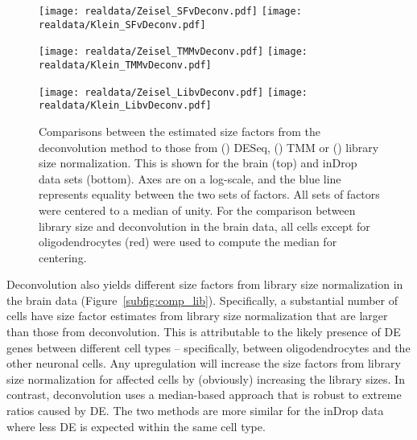\documentclass{article}
\begin{document}
\begin{figure}[btp]
    \begin{minipage}{0.33\textwidth}
        \texttt{[image: realdata/Zeisel\_SFvDeconv.pdf]}
        \texttt{[image: realdata/Klein\_SFvDeconv.pdf]}
        \subcaption{}\label{subfig:comp_sf}
    \end{minipage}
    \begin{minipage}{0.33\textwidth}
        \texttt{[image: realdata/Zeisel\_TMMvDeconv.pdf]}
        \texttt{[image: realdata/Klein\_TMMvDeconv.pdf]}
    \subcaption{}\label{subfig:comp_tmm}
    \end{minipage}
    \begin{minipage}{0.33\textwidth}
        \texttt{[image: realdata/Zeisel\_LibvDeconv.pdf]}
        \texttt{[image: realdata/Klein\_LibvDeconv.pdf]}
        \subcaption{}\label{subfig:comp_lib}
    \end{minipage}
    \caption{
        Comparisons between the estimated size factors from the deconvolution method to those from () DESeq,  () TMM
            or () library size normalization.
        This is shown for the brain (top) and inDrop data sets (bottom).
        Axes are on a log-scale, and the blue line represents equality between the two sets of factors.
        All sets of factors were centered to a median of unity.
        For the comparison between library size and deconvolution in the brain data, all cells except for oligodendrocytes (red) were used to compute the median for centering.
    }
    \label{fig:real_comp}  
\end{figure}

Deconvolution also yields different size factors from library size normalization in the brain data (Figure~\ref{subfig:comp_lib}).
Specifically, a substantial number of cells have size factor estimates from library size normalization that are larger than those from deconvolution.
This is attributable to the likely presence of DE genes between different cell types -- specifically, between oligodendrocytes and the other neuronal cells.
Any upregulation will increase the size factors from library size normalization for affected cells by (obviously) increasing the library sizes.
In contrast, deconvolution uses a median-based approach that is robust to extreme ratios caused by DE.
The two methods are more similar for the inDrop data where less DE is expected within the same cell type.
\end{document}
